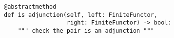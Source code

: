 \par\begin{minipage}{60ex}
\begin{verbatim}
@abstractmethod
def is_adjunction(self, left: FiniteFunctor,
                  right: FiniteFunctor) -> bool:
    """ check the pair is an adjunction """
\end{verbatim}
\end{minipage}\par